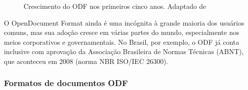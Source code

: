 \begin{figure}[ht]
    \centering
    \caption{Crescimento do ODF nos primeiros cinco anos. Adaptado de \cite{SILVA}}
    \label{crescimento_odf}
\end{figure}

\begin{citacao}
O OpenDocument Format ainda é uma incógnita à grande maioria dos usuários comuns, mas sua adoção cresce em várias partes do mundo, especialmente nos meios corporativos e governamentais. No Brasil, por exemplo, o ODF já conta inclusive com aprovação da Associação Brasileira de Normas Técnicas (ABNT), que aconteceu em 2008 (norma NBR ISO/IEC 26300)\cite{ALECRIM-ODF}.
\end{citacao}

\subsubsection{Formatos de documentos ODF}

